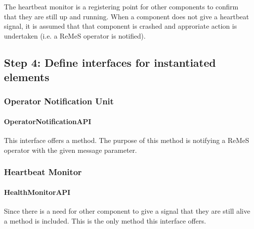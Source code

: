 \npar The heartbeat monitor is a registering point for other components to
confirm that they are still up and running. When a component does not give a
heartbeat signal, it is assumed that that component is crashed and approriate
action is undertaken (i.e. a ReMeS operator is notified).

\subsection{Step 4: Define interfaces for instantiated elements}
\label{add:it8/interfaces}

\subsubsection{Operator Notification Unit}

\paragraph{OperatorNotificationAPI}
\npar This interface offers a  method. The
purpose of this method is notifying a ReMeS operator with the given message
parameter. 

\subsubsection{Heartbeat Monitor}

\paragraph{HealthMonitorAPI}
\npar Since there is a need for other component to give a signal that they are
still alive a method  is included. This is the only method this
interface offers.

